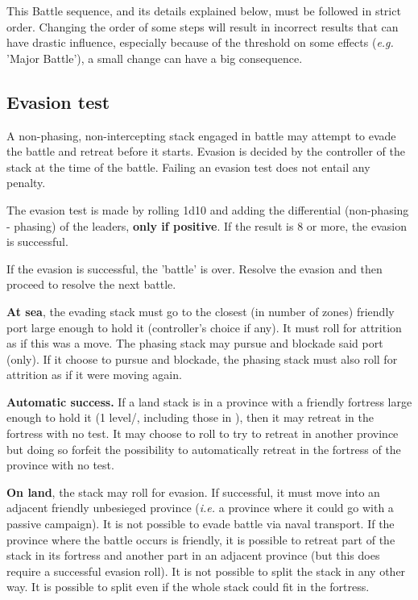 This Battle sequence, and its details explained below, must be followed in
strict order. Changing the order of some steps will result in incorrect
results that can have drastic influence, especially because of the threshold
on some effects (\emph{e.g.} 'Major Battle'), a small change can have a big
consequence.

\subsection{Evasion test}
\label{chMilitary:Battle:Evasion}
A non-phasing, non-intercepting stack engaged in battle may attempt to evade
the battle and retreat before it starts. Evasion is decided by the controller
of the stack at the time of the battle. Failing an evasion test does not
entail any penalty.

The evasion test is made by rolling 1d10 and adding the \Man differential
(non-phasing - phasing) of the leaders, \textbf{only if positive}. If the
result is 8 or more, the evasion is successful.

If the evasion is successful, the 'battle' is over. Resolve the evasion and
then proceed to resolve the next battle.

\textbf{At sea}, the evading stack must go to the closest (in number of zones)
friendly port large enough to hold it (controller's choice if any). It must
roll for attrition as if this was a move. The phasing stack may pursue and
blockade said port (only). If it choose to pursue and blockade, the phasing
stack must also roll for attrition as if it were moving again.

\textbf{Automatic success.} If a land stack is in a province with a friendly
fortress large enough to hold it (1 level/\LD, including those in \Pashas),
then it may retreat in the fortress with no test. It may choose to roll to try
to retreat in another province but doing so forfeit the possibility to
automatically retreat in the fortress of the province with no test.

\textbf{On land}, the stack may roll for evasion. If successful, it must move
into an adjacent friendly unbesieged province (\emph{i.e.} a province where it
could go with a passive campaign). It is not possible to evade battle via
naval transport. If the province where the battle occurs is friendly, it is
possible to retreat part of the stack in its fortress and another part in an
adjacent province (but this does require a successful evasion roll). It is not
possible to split the stack in any other way. It is possible to split even if
the whole stack could fit in the fortress.

